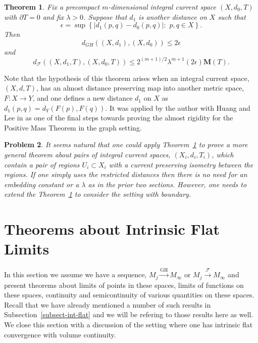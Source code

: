 \documentclass[12pt]{amsart}
\newtheorem{thm}{Theorem}[section]
\newtheorem{problem}[thm]{Problem}
\begin{document}
\begin{thm}\label{app-thm}
Fix a precompact $m$-dimensional integral current space $(X, d_0, T)$
with $\partial T=0$ and fix
$\lambda>0$.   Suppose that
$d_1$ is another distance on $X$ such that
\begin{equation}\label{eps}
\epsilon= \sup\left\{|d_1(p,q)-d_0(p,q)|:\,\, p,q\in X\right\}. 
\end{equation} 
Then
\begin{equation}
d_{GH}\left((X, d_1), (X, d_0)\right) \le 2\epsilon
\end{equation}
and 
\begin{equation}
d_{\mathcal{F}}\left((X, d_1, T), (X, d_0, T)\right) \le
2^{(m+1)/2} \lambda^{m+1} (2\epsilon) {{\mathbf M}}(T).
\end{equation}
\end{thm}

Note that the hypothesis of this theorem arises when
an integral current space, $(X,d,T)$, has an almost distance
preserving map into another
metric space, $F: X \to Y$, and one defines a new distance
$d_1$ on $X$ as $d_1(p,q)=d_Y(F(p), F(q))$.   It was applied by the author
with Huang and Lee in \cite{HLS}
as one of the final steps towards proving the almost rigidity for the 
Positive Mass Theorem in the graph setting.

\begin{problem}
It seems natural that one could apply Theorem~\ref{app-thm} to
prove a more general theorem about pairs of integral current
spaces, $(X_i, d_i, T_i)$, which contain a pair of regions
$U_i \subset X_i$ with a current preserving isometry
between the regions.  If one simply uses the restricted 
distances then there is no need for an embedding constant
or a $\lambda$ as in the prior two sections.  However, one
needs to extend the Theorem~\ref{app-thm} to consider
the setting with boundary.
\end{problem}

 
\section{Theorems about Intrinsic Flat Limits}\label{sect-AA-prop}
 
In this section we assume we have a sequence, 
$M_j {\stackrel { \textrm{GH}}{\longrightarrow} } M_\infty$ or $M_j {\stackrel {\mathcal{F}}{\longrightarrow} } M_\infty$
and present theorems about limits of points in these spaces,
limits of functions on these spaces, continuity and semicontinuity of
various quantities on these spaces.   Recall that we
have already mentioned a number of such results in 
Subsection~\ref{subsect-int-flat} and we will be refering to
those results here as well.   We close this section with a discussion
of the setting where one has intrinsic flat convergence with
volume continuity.
 
\end{document}
